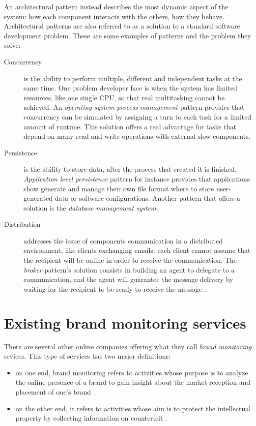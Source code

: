 An architectural pattern instead describes the most dynamic aspect of the
system: how each component interacts with the others, how they behave.
Architectural patterns are also referred to as a solution to a standard software
development problem. These are some examples of patterns and the problem they
solve:
\begin{description}
\item[Concurrency] is the ability to perform multiple, different and
independent tasks at the same time. One problem developer face is when the
system has limited resources, like one single CPU, so that real multitasking
cannot be achieved. An \emph{operating system process management} pattern
provides that concurrency can be simulated by assigning a turn to each task for
a limited amount of runtime. This solution offers a real advantage for tasks
that depend on many read and write operations with external slow components.
\item[Persistence] is the ability to store data, after the process that created
it is finished. \emph{Application level persistence} pattern for instance
provides that applications show generate and manage their own file format where
to store user-generated data or software configurations. Another pattern that
offers a solution is the \emph{database management system}.
\item[Distribution] addresses the issue of components communication in a
distributed environment, like clients exchanging emails: each client cannot
assume that the recipient will be online in order to receive the communication.
The \emph{broker} pattern's solution consists in building an agent to delegate
to a communication, and the agent will guarantee the message delivery by waiting
for the recipient to be ready to receive the message \cite{JB00}.
\end{description}

\section{Existing brand monitoring services}
There are several other online companies offering what they call \emph{brand
monitoring} sevices. This type of services has two major definitions:
\begin{itemize}
  \item on one end, brand monitoring refers to activities whose purpose is to
  analyze the online presence of a brand to gain insight about the market
  reception and placement of one's brand \cite{}.
  \item on the other end, it refers to activities whose aim is to protect the
  intellectual property by collecting information on counterfeit \cite{}.
\end{itemize}

